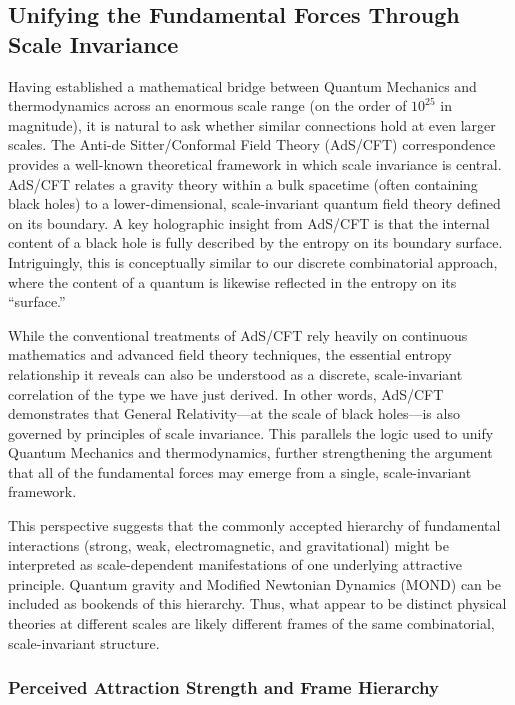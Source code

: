 \documentclass{article}
\begin{document}
\subsection*{Unifying the Fundamental Forces Through Scale Invariance}

Having established a mathematical bridge between Quantum Mechanics and thermodynamics across an enormous scale range (on the order of $10^{25}$ in magnitude), it is natural to ask whether similar connections hold at even larger scales. The Anti-de Sitter/Conformal Field Theory (AdS/CFT) correspondence provides a well-known theoretical framework in which scale invariance is central. AdS/CFT relates a gravity theory within a bulk spacetime (often containing black holes) to a lower-dimensional, scale-invariant quantum field theory defined on its boundary. A key holographic insight from AdS/CFT is that the internal content of a black hole is fully described by the entropy on its boundary surface. Intriguingly, this is conceptually similar to our discrete combinatorial approach, where the content of a quantum is likewise reflected in the entropy on its “surface.”

While the conventional treatments of AdS/CFT rely heavily on continuous mathematics and advanced field theory techniques, the essential entropy relationship it reveals can also be understood as a discrete, scale-invariant correlation of the type we have just derived. In other words, AdS/CFT demonstrates that General Relativity—at the scale of black holes—is also governed by principles of scale invariance. This parallels the logic used to unify Quantum Mechanics and thermodynamics, further strengthening the argument that all of the fundamental forces may emerge from a single, scale-invariant framework.

This perspective suggests that the commonly accepted hierarchy of fundamental interactions (strong, weak, electromagnetic, and gravitational) might be interpreted as scale-dependent manifestations of one underlying attractive principle. Quantum gravity and Modified Newtonian Dynamics (MOND) can be included as bookends of this hierarchy. Thus, what appear to be distinct physical theories at different scales are likely different frames of the same combinatorial, scale-invariant structure.

\subsubsection*{Perceived Attraction Strength and Frame Hierarchy}
\end{document}
